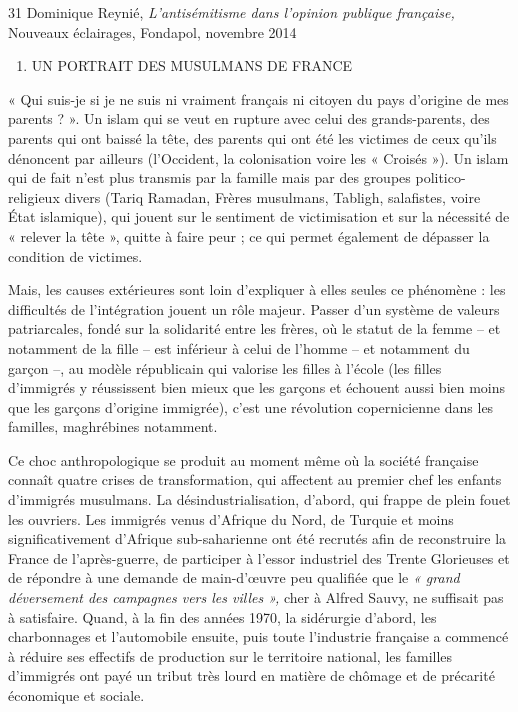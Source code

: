 31 Dominique Reynié, \emph{L'antisémitisme dans l'opinion publique
française,} Nouveaux éclairages, Fondapol, novembre 2014


\begin{enumerate}
\def\labelenumi{\Roman{enumi}.}
\item
  UN PORTRAIT DES MUSULMANS DE FRANCE
\end{enumerate}


« Qui suis-je si je ne suis ni vraiment français ni citoyen du pays
d'origine de mes parents ? ». Un islam qui se veut en rupture avec celui
des grands-parents, des parents qui ont baissé la tête, des parents qui
ont été les victimes de ceux qu'ils dénoncent par ailleurs (l'Occident,
la colonisation voire les « Croisés »). Un islam qui de fait n'est plus
transmis par la famille mais par des groupes politico-religieux divers
(Tariq Ramadan, Frères musulmans, Tabligh, salafistes, voire État
islamique), qui jouent sur le sentiment de victimisation et sur la
nécessité de « relever la tête », quitte à faire peur ; ce qui permet
également de dépasser la condition de victimes.

Mais, les causes extérieures sont loin d'expliquer à elles seules ce
phénomène : les difficultés de l'intégration jouent un rôle majeur.
Passer d'un système de valeurs patriarcales, fondé sur la solidarité
entre les frères, où le statut de la femme -- et notamment de la fille
-- est inférieur à celui de l'homme -- et notamment du garçon --, au
modèle républicain qui valorise les filles à l'école (les filles
d'immigrés y réussissent bien mieux que les garçons et échouent aussi
bien moins que les garçons d'origine immigrée), c'est une révolution
copernicienne dans les familles, maghrébines notamment.

Ce choc anthropologique se produit au moment même où la société
française connaît quatre crises de transformation, qui affectent au
premier chef les enfants d'immigrés musulmans. La désindustrialisation,
d'abord, qui frappe de plein fouet les ouvriers. Les immigrés venus
d'Afrique du Nord, de Turquie et moins significativement d'Afrique
sub-saharienne ont été recrutés afin de reconstruire la France de
l'après-guerre, de participer à l'essor industriel des Trente Glorieuses
et de répondre à une demande de main-d'œuvre peu qualifiée que le
\emph{« grand déversement des campagnes vers les villes »,} cher à
Alfred Sauvy, ne suffisait pas à satisfaire. Quand, à la fin des années
1970, la sidérurgie d'abord, les charbonnages et l'automobile ensuite,
puis toute l'industrie française a commencé à réduire ses effectifs de
production sur le territoire national, les familles d'immigrés ont payé
un tribut très lourd en matière de chômage et de précarité économique et
sociale.

